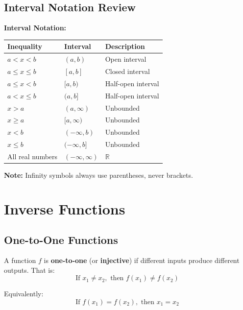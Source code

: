 \documentclass[12pt,a4paper]{article}
\begin{document}
\subsection{Interval Notation Review}

\begin{note}
\textbf{Interval Notation:}

\begin{center}
\begin{tabular}{|l|l|l|}
\hline
\textbf{Inequality} & \textbf{Interval} & \textbf{Description} \\
\hline
$a < x < b$ & $(a, b)$ & Open interval \\
$a \leq x \leq b$ & $[a, b]$ & Closed interval \\
$a \leq x < b$ & $[a, b)$ & Half-open interval \\
$a < x \leq b$ & $(a, b]$ & Half-open interval \\
$x > a$ & $(a, \infty)$ & Unbounded \\
$x \geq a$ & $[a, \infty)$ & Unbounded \\
$x < b$ & $(-\infty, b)$ & Unbounded \\
$x \leq b$ & $(-\infty, b]$ & Unbounded \\
All real numbers & $(-\infty, \infty)$ & $\mathbb{R}$ \\
\hline
\end{tabular}
\end{center}

\textbf{Note:} Infinity symbols always use parentheses, never brackets.
\end{note}

\section{Inverse Functions}

\subsection{One-to-One Functions}

\begin{definition}
A function $f$ is \textbf{one-to-one} (or \textbf{injective}) if different inputs produce different outputs. That is:
\[
\text{If } x_1 \neq x_2, \text{ then } f(x_1) \neq f(x_2)
\]

Equivalently:
\[
\text{If } f(x_1) = f(x_2), \text{ then } x_1 = x_2
\]
\end{definition}
\end{document}
